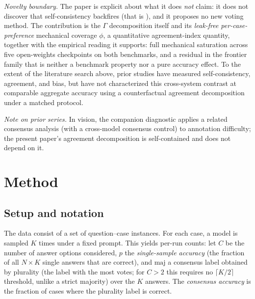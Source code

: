 \documentclass{article}
\newcommand{\agreementIndex}{\Gamma}
\begin{document}
\emph{Novelty boundary.}
The paper is explicit about what it does \emph{not} claim: it does not discover that self-consistency backfires (that is \cite{bahuguna2026when}), and it proposes no new voting method.
The contribution is the $\agreementIndex$ decomposition itself and its
\emph{leak-free per-case-preference} mechanical coverage $\phi$, a
quantitative agreement-index quantity, together with the empirical
reading it supports: full mechanical saturation across
five open-weights checkpoints on both benchmarks, and a residual in
the frontier family that is neither a benchmark property nor a pure
accuracy effect. To the extent of the literature
search above, prior studies have measured self-consistency, agreement,
and bias, but have not characterized this cross-system contrast at
comparable aggregate accuracy using a counterfactual agreement decomposition under a
matched protocol.

\emph{Note on prior series.}
In vision, the companion diagnostic \cite{anchorscore2026} applies a
related consensus analysis (with a cross-model consensus control) to
annotation difficulty; the present paper's agreement decomposition is
self-contained and does not depend on it.

\section{Method}
\label{sec:method}

\subsection{Setup and notation}
\label{sec:setup}

The data consist of a set of question--case instances. For each case, a model is
sampled $K$ times under a fixed prompt. This yields per-run counts: let
$C$ be the number of answer options considered, $p$ the
\emph{single-sample accuracy} (the fraction of all $N\times K$ single
answers that are correct), and $\mathrm{maj}$ a consensus label
obtained by plurality (the label with the most votes; for $C>2$ this
requires no $\lceil K/2\rceil$ threshold, unlike a strict majority) over
the $K$ answers. The \emph{consensus accuracy} is the fraction of cases
where the plurality label is correct.
\end{document}
